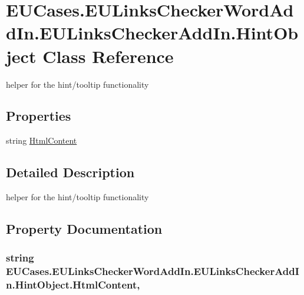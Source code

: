 \hypertarget{class_e_u_cases_1_1_e_u_links_checker_word_add_in_1_1_e_u_links_checker_add_in_1_1_hint_object}{\section{E\+U\+Cases.\+E\+U\+Links\+Checker\+Word\+Add\+In.\+E\+U\+Links\+Checker\+Add\+In.\+Hint\+Object Class Reference}
\label{class_e_u_cases_1_1_e_u_links_checker_word_add_in_1_1_e_u_links_checker_add_in_1_1_hint_object}
}


helper for the hint/tooltip functionality  


\subsection*{Properties}
\begin{DoxyCompactItemize}
\item 
string \hyperlink{class_e_u_cases_1_1_e_u_links_checker_word_add_in_1_1_e_u_links_checker_add_in_1_1_hint_object_ae356fa9ea937bd7c40bb918ab340dcba}{Html\+Content}
\end{DoxyCompactItemize}


\subsection{Detailed Description}
helper for the hint/tooltip functionality 



\subsection{Property Documentation}
\hypertarget{class_e_u_cases_1_1_e_u_links_checker_word_add_in_1_1_e_u_links_checker_add_in_1_1_hint_object_ae356fa9ea937bd7c40bb918ab340dcba}{
\subsubsection[{Html\+Content}]{\setlength{\rightskip}{0pt plus 5cm}string E\+U\+Cases.\+E\+U\+Links\+Checker\+Word\+Add\+In.\+E\+U\+Links\+Checker\+Add\+In.\+Hint\+Object.\+Html\+Content\hspace{0.3cm}{\ttfamily [get]}, {\ttfamily [set]}}}\label{class_e_u_cases_1_1_e_u_links_checker_word_add_in_1_1_e_u_links_checker_add_in_1_1_hint_object_ae356fa9ea937bd7c40bb918ab340dcba}


